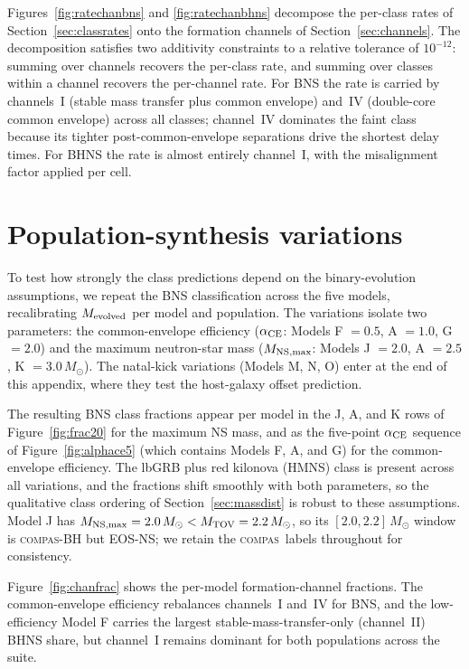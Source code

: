 \documentclass[twocolumn,amsmath]{aastex702}
\newcommand{\Msun}{M_\odot}
\newcommand{\Mtov}{M_{\rm TOV}}
\newcommand{\compas}{\textsc{compas}}
\begin{document}
Figures~\ref{fig:ratechanbns} and \ref{fig:ratechanbhns} decompose the
per-class rates of Section~\ref{sec:classrates} onto the
\citet{broekgaarden2021} formation channels of Section~\ref{sec:channels}. The decomposition
satisfies two additivity constraints to a relative tolerance of $10^{-12}$: summing
over channels recovers the per-class rate, and summing over classes within a
channel recovers the per-channel rate. For BNS the rate is carried by channels~I
(stable mass transfer plus common envelope) and~IV (double-core common
envelope) across all classes; channel~IV dominates the faint class because its
tighter post-common-envelope separations drive the shortest delay times. For
BHNS the rate is almost entirely channel~I, with the misalignment factor
applied per cell.

\FloatBarrier
\section{Population-synthesis variations} \label{app:robustness}

To test how strongly the class predictions depend on the binary-evolution
assumptions, we repeat the BNS classification across the five
\citet{broekgaarden2021} models, recalibrating $M_{\rm evolved}$ per model and
population. The variations isolate two parameters: the common-envelope efficiency
($\alpha_{\rm CE}$: Models F $=0.5$, A $=1.0$, G $=2.0$) and the maximum
neutron-star mass ($M_{\rm NS,max}$: Models J $=2.0$, A $=2.5$, K $=3.0\,\Msun$).
The natal-kick variations (Models M, N, O) enter at the end of this appendix,
where they test the host-galaxy offset prediction.

The resulting BNS class fractions appear per model in the J, A, and K rows of
Figure~\ref{fig:frac20} for the maximum NS mass, and as the five-point
$\alpha_{\rm CE}$ sequence of Figure~\ref{fig:alphace5} (which contains Models
F, A, and G) for the common-envelope efficiency. The lbGRB plus red kilonova
(HMNS) class is present across all variations, and the fractions shift smoothly
with both parameters, so the qualitative class ordering of
Section~\ref{sec:massdist} is robust to these assumptions. Model J has
$M_{\rm NS,max} = 2.0\,\Msun < \Mtov = 2.2\,\Msun$, so its $[2.0, 2.2]\,\Msun$
window is \compas-BH but EOS-NS; we retain the \compas\ labels throughout for
consistency.

Figure~\ref{fig:chanfrac} shows the per-model formation-channel fractions. The
common-envelope efficiency rebalances channels~I and~IV for BNS, and the
low-efficiency Model F carries the largest stable-mass-transfer-only
(channel~II) BHNS share, but channel~I remains
dominant for both populations across the suite.
\end{document}
